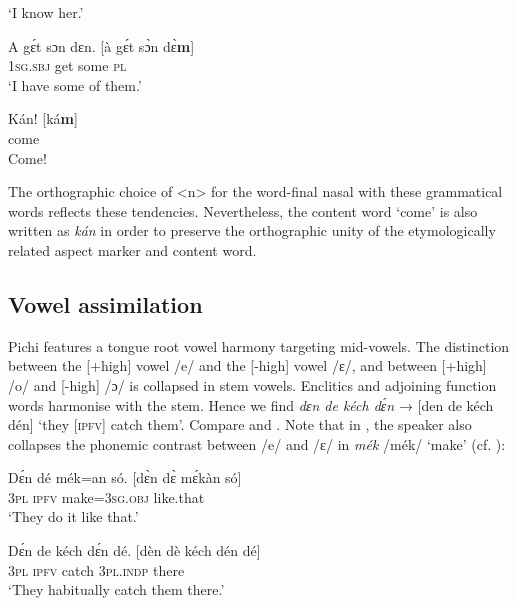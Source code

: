 \glt ‘I know her.’
\z


\ea%
    \label{ex:key:33}
    \gll   A    gɛ́t  sɔn    dɛn.      \textup{[à  gɛ́t  sɔ̀n  dɛ̀\textbf{m}]}\\
\textsc{1sg.sbj}  get  some  \textsc{pl}\\

\glt ‘I have some of them.’
\z


\ea%
    \label{ex:key:34}
    \gll   Kán!                  \textup{[ká\textbf{m}]}\\
come\\

\glt Come!
\z

The orthographic choice of <n> for the word-final nasal with these grammatical words reflects these tendencies. Nevertheless, the content word ‘come’ is also written as \textit{kán} in order to preserve the orthographic unity of the etymologically related aspect marker and content word. 

\subsection{Vowel assimilation}\label{sec:2.5.3}

Pichi features a tongue root vowel harmony targeting mid-vowels. The distinction between the [+high] vowel /e/ and the [-high] vowel /ɛ/, and between [+high] /o/ and \mbox{[-high]} /ɔ/ is collapsed in stem vowels. Enclitics and adjoining function words harmonise with the stem. Hence we find \textit{dɛn de kéch dɛ́n} → [den de kéch dén] ‘they [\textsc{ipfv}] catch them’. Compare  and . Note that in , the speaker also collapses the phonemic contrast between /e/ and /ɛ/ in \textit{mék} /mék/ ‘make’ (cf. ):


\ea%
    \label{ex:key:35}
    \gll   Dɛ́n  dé  mék=an    só.         \textup{[dɛ̀n  dɛ̀ mɛ́kàn só]}\\
\textsc{3pl}  \textsc{ipfv}  make=\textsc{3sg.obj}  like.that\\

\glt ‘They do it like that.’
\z


\ea%
    \label{ex:key:36}
    \gll   Dɛ́n  de  kéch  dɛ́n    dé.      \textup{[dèn   dè kéch dén dé]}\\
\textsc{3pl}  \textsc{ipfv}  catch  \textsc{3pl.indp}  there\\

\glt ‘They habitually catch them there.’
\z


